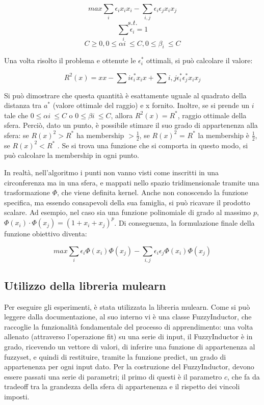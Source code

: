 \documentclass[12pt,a4paper]{report}
\begin{document}
\[ max \sum_{i}\epsilon_ix_ix_i - \sum_{i,j}\epsilon_i\epsilon_jx_ix_j\]
\[s.t.\]
\[\sum_i\epsilon_i = 1\]
\[ C \geq 0, 0 \leq \alpha{i}\ \leq C , 0 \leq \beta_{i}\ \leq C \]

Una volta risolto il problema e ottenute le $\epsilon_i^*$ ottimali, si può calcolare il valore:

\[ R^2(x) = xx - \sum{i}\epsilon_i^*x_ix + \sum{i,j}\epsilon_i^*\epsilon_j^*x_ix_j\]

Si può dimostrare che questa quantità è esattamente uguale al quadrato della distanza tra $a^*$ (valore ottimale del raggio) e x fornito. Inoltre,  se si prende un $i$ tale che $0 \leq \alpha{i}\ \leq C$ o $0 \leq \beta{i}\ \leq C$,  allora $R^2(x) = R^*$, raggio ottimale della sfera.
Perciò, dato un punto, è possibile stimare il suo grado di appartenenza alla sfera: se $R(x)^2 > R^*$ ha membership $>\frac{1}{2}$, se $R(x)^2$ = $R^*$ la membership è  $\frac{1}{2}$, se $R(x)^2  <R^*$ .
Se si trova una funzione che si comporta in questo modo, si può calcolare la membership in ogni punto.

In realtà, nell'algoritmo i punti non vanno visti come inscritti in una circonferenza ma in una sfera, e mappati nello spazio tridimensionale tramite una trasformazione $\Phi$, che viene definita kernel. Anche non conoscendo la funzione specifica, ma essendo consapevoli della sua famiglia, si può ricavare il prodotto scalare. Ad esempio, nel caso sia una funzione polinomiale di grado al massimo $p$, $\Phi(x_i)\cdot \Phi(x_j) = (1 + x_i + x_j)^p$.
Di conseguenza, la formulazione finale della funzione obiettivo diventa:

\[ max \sum_{i}\epsilon_i\Phi(x_i)\Phi(x_j) - \sum_{i,j}\epsilon_i\epsilon_j\Phi(x_i)\Phi(x_j)\]

\subsection{Utilizzo della libreria mulearn}

Per eseguire gli esperimenti, è stata utilizzata la libreria mulearn.\cite{mulearn}
Come si può leggere dalla documentazione, al suo interno vi è una classe FuzzyInductor, che raccoglie la funzionalità fondamentale del processo di apprendimento: una volta allenato (attraverso l'operazione fit) su una serie di input, il FuzzyInductor è in grado, ricevendo un vettore di valori, di inferire una funzione di appartenenza al fuzzyset, e quindi di restituire, tramite la funzione predict, un grado di appartenenza per ogni input dato.
Per la costruzione del FuzzyInductor, devono essere passati una serie di parametri; il primo di questi è il parametro $c$, che fa da tradeoff tra la grandezza della sfera di appartenenza e il rispetto dei vincoli imposti. 
\end{document}
